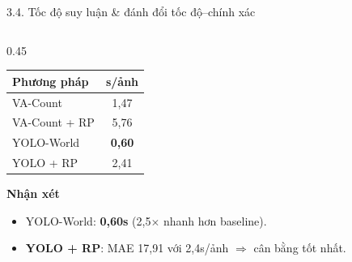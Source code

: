 \documentclass[11pt]{beamer}
\begin{document}
\begin{frame}{3.4. Tốc độ suy luận \& đánh đổi tốc độ--chính xác}
\scriptsize

\begin{columns}[T,onlytextwidth]
\begin{column}{0.45\textwidth}

\centering
\renewcommand{\arraystretch}{1.25}
\begin{tabular}{|l|c|}
\hline
\rowcolor{uitblue!15}
\textbf{Phương pháp} & \textbf{s/ảnh} \\
\hline
VA-Count & 1,47 \\
\hline
VA-Count + RP & 5,76 \\
\hline
\rowcolor{green!8} YOLO-World & \textbf{0,60} \\
\hline
\rowcolor{orange!10} YOLO + RP & 2,41 \\
\hline
\end{tabular}

\vspace{0.5em}

\begin{block}{\textbf{Nhận xét}}
\begin{itemize}
  \item YOLO-World: \textbf{0,60s} (2,5$\times$ nhanh hơn baseline).
  \item \textbf{YOLO + RP}: MAE 17,91 với 2,4s/ảnh $\Rightarrow$ cân bằng tốt nhất.
\end{itemize}
\end{block}

\end{column}


\end{columns}
\end{frame}
\end{document}

